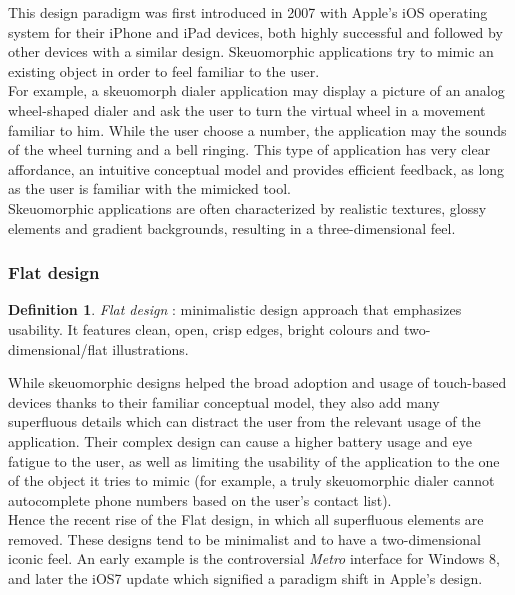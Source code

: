 \documentclass[a4paper,11pt] {article}
\theoremstyle{definition}
\newtheorem{defn}{Definition}[section]
\begin{document}
        This design paradigm was first introduced in 2007 with Apple's iOS operating system for their iPhone and iPad devices, both highly successful and followed by other devices with a similar design. Skeuomorphic applications try to mimic an existing object in order to feel familiar to the user.\\

        For example, a skeuomorph dialer application may display a picture of an analog wheel-shaped dialer and ask the user to turn the virtual wheel in a movement familiar to him. While the user choose a number, the application may the sounds of the wheel turning and a bell ringing. This type of application has very clear affordance, an intuitive conceptual model and provides efficient feedback, as long as the user is familiar with the mimicked tool.\\

        Skeuomorphic applications are often characterized by realistic textures, glossy elements and gradient backgrounds, resulting in a three-dimensional feel.

        \subsubsection{Flat design}
        \begin{defn}
        \textit{Flat design} \cite{whatIsFlat}: minimalistic design approach that emphasizes usability. It features clean, open, crisp edges, bright colours and two-dimensional/flat illustrations.
        \end{defn}

        While skeuomorphic designs helped the broad adoption and usage of touch-based devices thanks to their familiar conceptual model, they also add many superfluous details which can distract the user from the relevant usage of the application. Their complex design can cause a higher battery usage and eye fatigue to the user, as well as limiting the usability of the application to the one of the object it tries to mimic (for example, a truly skeuomorphic dialer cannot autocomplete phone numbers based on the user's contact list).\\

        Hence the recent rise of the Flat design, in which all superfluous elements are removed. These designs tend to be minimalist and to have a two-dimensional iconic feel. An early example is the controversial \textit{Metro} interface for Windows 8, and later the iOS7 update which signified a paradigm shift in Apple's design.
\end{document}
